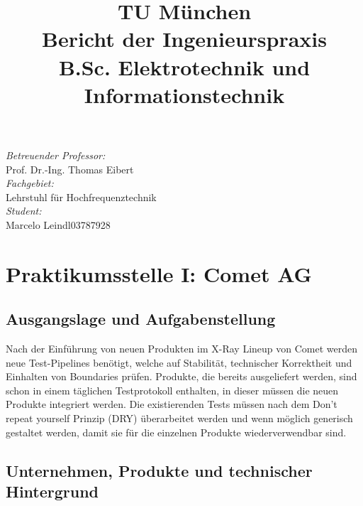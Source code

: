 \documentclass[12pt]{article} %
\title{\textbf{\fontsize{50}{60}\selectfont TU München}\\ %
\vspace{0.5cm} \textbf{\Huge Bericht der Ingenieurspraxis} \\ %
\vspace{0.3cm} \Large B.Sc. Elektrotechnik und Informationstechnik} %
\date{} %
\begin{document}
\maketitle

\vspace{2cm} %

\begin{center}
    \Large \textit {Betreuender Professor:} \\ Prof. Dr.-Ing. Thomas Eibert \\[0.5cm]
    \Large \textit {Fachgebiet:} \\ Lehrstuhl für Hochfrequenztechnik \\[0.5cm]
    \Large \textit {Student:} \\ Marcelo Leindl\hspace{0.5cm}03787928
\end{center}

\newpage

\tableofcontents
\newpage

\section{Praktikumsstelle I: Comet AG}

\subsection{Ausgangslage und Aufgabenstellung}
Nach der Einführung von neuen Produkten im X-Ray Lineup von Comet werden neue Test-Pipelines benötigt, welche auf Stabilität, technischer Korrektheit und Einhalten von Boundaries prüfen.
Produkte, die bereits ausgeliefert werden, sind schon in einem täglichen Testprotokoll enthalten, in dieser müssen die neuen Produkte integriert werden.
Die existierenden Tests müssen nach dem Don't repeat yourself Prinzip (DRY) überarbeitet werden und wenn möglich generisch gestaltet werden, damit sie für die einzelnen Produkte wiederverwendbar sind.

\subsection{Unternehmen, Produkte und technischer Hintergrund}
\end{document}
